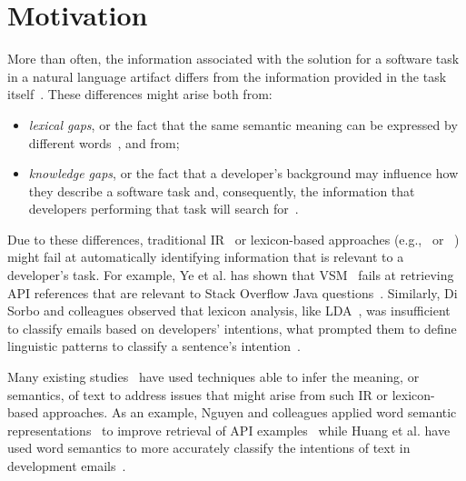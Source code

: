 \section{Motivation}
\label{cp5:motivation}




More than often, the information associated 
with the solution for a software task in a natural language artifact differs from the information provided in the task itself~\cite{silva2019, Ye2016}.
These differences might arise both from:

\begin{itemize}
    \item \textit{lexical gaps}, or the fact that the same semantic meaning can be expressed by different words~\cite{Huang2018}, and from;
    \item \textit{knowledge gaps},
    or the fact that a developer's background may 
    influence how they describe a software task and, consequently,
    the information that developers performing that task will search for~\cite{Kevic2014}.
\end{itemize}





Due to these differences, traditional \acf{IR}~\cite{Manning2009IR} or lexicon-based approaches (e.g.,~\cite{Ponzanelli2015} or ~\cite{Xu2017}) might fail at automatically identifying information that is relevant to a developer's task. 
For example, Ye et al. has shown that \acf{VSM}~\cite{salton1975vector} 
 fails at retrieving API references that are relevant to Stack Overflow Java questions~\cite{Ye2016}.
Similarly,
Di Sorbo and colleagues observed that lexicon analysis, like \acs{LDA}~\cite{blei2003latent}, was insufficient to classify 
emails based on developers' intentions,
what prompted them to define linguistic patterns to classify a sentence's intention~\cite{Sorbo2015}.



Many existing studies~\cite{silva2019, Huang2018, Ye2016, huang2018automating} have used 
techniques able to infer the
meaning, or semantics, of text to address issues that might arise from such \acs{IR} or lexicon-based approaches.
As an example, Nguyen and colleagues applied word semantic representations~\cite{Mikolov2013space} to improve  retrieval of API examples~\cite{nguyen2017} while Huang et al. have used word semantics 
to more accurately classify the intentions of text in development emails~\cite{huang2018automating}.



